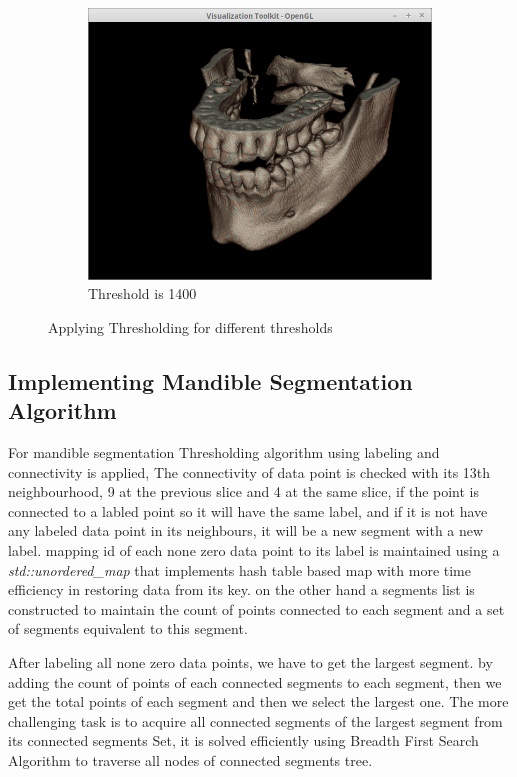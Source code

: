 \documentclass[10pt, b5paper]{article}
\begin{document}
\begin{figure}
\begin{subfigure}[b]{0.33\textwidth}
        \centering
        \includegraphics[width=\textwidth]{T1400}
        \caption{Threshold is 1400}
    \end{subfigure}
    \caption{Applying Thresholding for different thresholds}
    \label{fig:Thresholding}
\end{figure}

\subsection{Implementing Mandible Segmentation Algorithm}
For mandible segmentation Thresholding algorithm using labeling and connectivity is applied, The connectivity of data point is checked with its 13th neighbourhood, 9 at the previous slice and 4 at the same slice, if the point is connected to a labled point so it will have the same label, and if it is not have any labeled data point in its neighbours, it will be a new segment with a new label. mapping id of  each none zero data point to its label is maintained using a \textit{std::unordered\_map} that implements hash table based map with more time efficiency in restoring data from its key. on the other hand a segments list is constructed to maintain the count of points connected to each segment and a set of segments equivalent to this segment.

After labeling all none zero data points, we have to get the largest segment. by adding the count of points of each connected segments to each segment, then we get the total points of each segment and then we select the largest one. The more challenging task is to acquire all connected segments of the largest segment from its connected segments Set, it is solved efficiently using Breadth First Search Algorithm to traverse all nodes of connected segments tree. 
\end{document}
